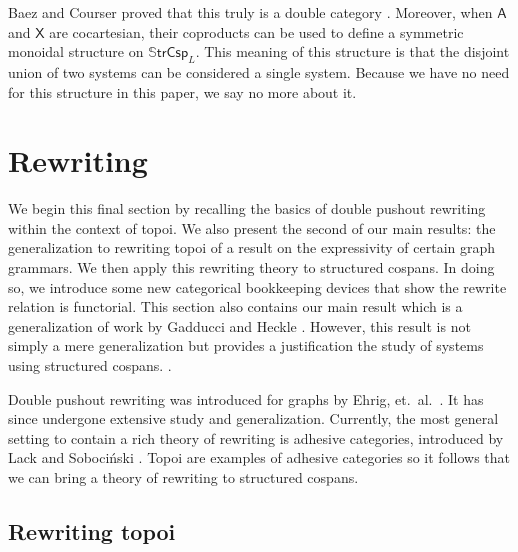 \documentclass{amsart}
\newcommand{\SSStrCsp}{\dblcat{S} \cat{trCsp}}
\newcommand{\cat}[1]{\mathsf{#1}}
\newcommand{\dblcat}[1]{\mathbb{#1}}
\theoremstyle{remark}
\theoremstyle{definition}
\begin{document}
Baez and Courser proved that this truly is a double category
\cite[Cor.~3.9]{StrCsp}. Moreover, when $ \cat{ A } $ and
$ \cat{ X } $ are cocartesian, their coproducts can be used to define
a symmetric monoidal structure on $ \SSStrCsp_L $. This meaning of
this structure is that the disjoint union of two systems can be
considered a single system. Because we have no need for this structure
in this paper, we say no more about it.


\section{Rewriting}
\label{sec:rewriting}

We begin this final section by recalling the basics of double pushout
rewriting within the context of topoi. We also present the second of
our main results: the generalization to rewriting topoi of a result on
the expressivity of certain graph grammars.  We then apply this
rewriting theory to structured cospans. In doing so, we introduce some
new categorical bookkeeping devices that show the rewrite
relation is functorial. This section also contains our main
result which is a generalization of work by Gadducci and Heckle
\cite{Gadd_IndGraphTrans}.  However, this result is not simply a mere
generalization but provides a justification the study of systems using structured
cospans. .

Double pushout rewriting was introduced for graphs by Ehrig, et.~al.\
\cite{Ehrig_GraphGram}. It has since undergone extensive study and
generalization. Currently, the most general setting to contain a rich
theory of rewriting is adhesive categories, introduced by Lack and
Soboci\'{n}ski \cite{LackSobo_Adhesive}. Topoi are examples of
adhesive categories \cite{LackSobo_ToposIsAdh} so it follows that we
can bring a theory of rewriting to structured cospans.

\subsection{Rewriting topoi}
\label{sec:Adhesive-Rewriting}
\end{document}
